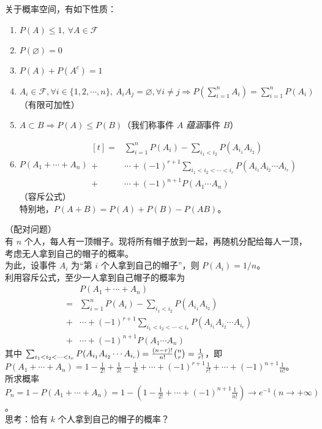 \documentclass[../main.tex]{subfiles}
\begin{document}
\begin{proposition}
    关于概率空间，有如下性质：
    \begin{enumerate}
        \item $P(A)\leq 1,\ \forall A\in\mathcal{F}$
        \item $P(\varnothing)=0$
        \item $P(A)+P(A^c)=1$
        \item $A_i\in\mathcal{F},\forall i\in\{1,2,\cdots,n\},\ A_iA_j=\varnothing,\forall i\neq j\Rightarrow P(\sum_{i=1}^n A_i)=\sum_{i=1}^n P(A_i)$（有限可加性）
        \item $A\subset B\Rightarrow P(A)\leq P(B)$（我们称事件 $A$ \emph{蕴涵}事件 $B$）
        \item $P(A_1+\cdots+A_n)  \begin{aligned}[t]
                      = & \sum_{i=1}^n P(A_i)-\sum_{i_1<i_2}P(A_{i_1}A_{i_2})                       \\
                      + & \cdots+(-1)^{r+1}\sum_{i_1<i_2<\cdots<i_r}P(A_{i_1}A_{i_2}\cdots A_{i_r}) \\
                      + & \cdots+(-1)^{n+1}P(A_1\cdots A_n)
                  \end{aligned}$（容斥公式）\\
              特别地，$P(A+B)=P(A)+P(B)-P(AB)$。
    \end{enumerate}
\end{proposition}

\begin{example}
    （配对问题）\\
    有 $n$ 个人，每人有一顶帽子。现将所有帽子放到一起，再随机分配给每人一顶，考虑无人拿到自己的帽子的概率。\\
    为此，设事件 $A_i$ 为“第 $i$ 个人拿到自己的帽子”，则 $P(A_i)=1/n$。\\
    利用容斥公式，至少一人拿到自己帽子的概率为
    \begin{equation*}
        \begin{aligned}
              & P(A_1+\cdots+A_n)                                                         \\
            = & \sum_{i=1}^n P(A_i)-\sum_{i_1<i_2}P(A_{i_1}A_{i_2})                       \\
            + & \cdots+(-1)^{r+1}\sum_{i_1<i_2<\cdots<i_r}P(A_{i_1}A_{i_2}\cdots A_{i_r}) \\
            + & \cdots+(-1)^{n+1}P(A_1\cdots A_n)
        \end{aligned}
    \end{equation*}
    其中 $\sum_{i_1<i_2<\cdots<i_r}P(A_{i_1}A_{i_2}\cdots A_{i_r})=\frac{(n-r)!}{n!}\tbinom{n}{r}=\frac{1}{r!}$，即 $P(A_1+\cdots+A_n)=1-\frac{1}{2!}+\frac{1}{3!}-\frac{1}{4!}+\cdots+(-1)^{r+1}\frac{1}{r!}+\cdots+(-1)^{n+1}\frac{1}{n!}$。\\
    所求概率 $P_n=1-P(A_1+\cdots+A_n)=1-(1-\frac{1}{2!}+\cdots+(-1)^{n+1}\frac{1}{n!})\rightarrow e^{-1}(n\rightarrow+\infty)$。\\
    思考：恰有 $k$ 个人拿到自己的帽子的概率？
\end{example}
\end{document}
